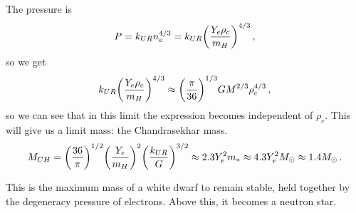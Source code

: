 \documentclass[main.tex]{subfiles}
\begin{document}
The pressure is 
%
\begin{align}
P = k_{UR} n_e^{4/3} 
= k_{UR}\qty(\frac{Y_e \rho_{c}}{m_H})^{4/3}
\,,
\end{align}
%
so we get 
%
\begin{align}
  k_{UR} \qty(\frac{Y_e \rho_{c}}{m_H})^{4/3} \approx 
  \qty(\frac{\pi }{36})^{1/3} G M^{2/3} \rho_{c}^{4/3}
\,,
\end{align}
%
so we can see that in this limit the expression becomes independent of \(\rho_{c}\). This will give us a limit mass: the Chandrasekhar mass.  
%
\begin{align}
  M_{CH} = 
  \qty(\frac{36}{\pi } )^{1/2} \qty(\frac{Y_e}{m_H})^2
  \qty(\frac{k_{UR}}{G})^{3/2} \approx 2.3 Y_e^2 m_{*} \approx 4.3 Y_e^2 M_{\odot} \approx 1.4 M_{\odot}
\,.
\end{align}

This is the maximum mass of a white dwarf to remain stable, held together by the degeneracy pressure of electrons. 
Above this, it becomes a neutron star.
\end{document}

